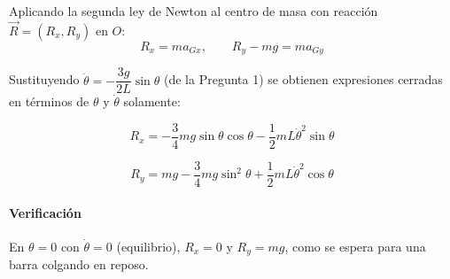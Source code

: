\begin{sol}
Aplicando la segunda ley de Newton al centro de masa con reacción $\vec{R} = (R_x, R_y)$ en $O$:
$$R_x = ma_{Gx}, \qquad R_y - mg = ma_{Gy}$$

Sustituyendo $\ddot{\theta} = -\dfrac{3g}{2L}\sin\theta$ (de la Pregunta 1) se obtienen expresiones cerradas en términos de $\theta$ y $\dot\theta$ solamente:

$$\boxed{R_x = -\frac{3}{4}mg\sin\theta\cos\theta - \frac{1}{2}mL\dot{\theta}^2\sin\theta}$$

$$\boxed{R_y = mg - \frac{3}{4}mg\sin^2\theta + \frac{1}{2}mL\dot{\theta}^2\cos\theta}$$

\paragraph{Verificación} En $\theta = 0$ con $\dot\theta = 0$ (equilibrio), $R_x = 0$ y $R_y = mg$, como se espera para una barra colgando en reposo.

\end{sol}
